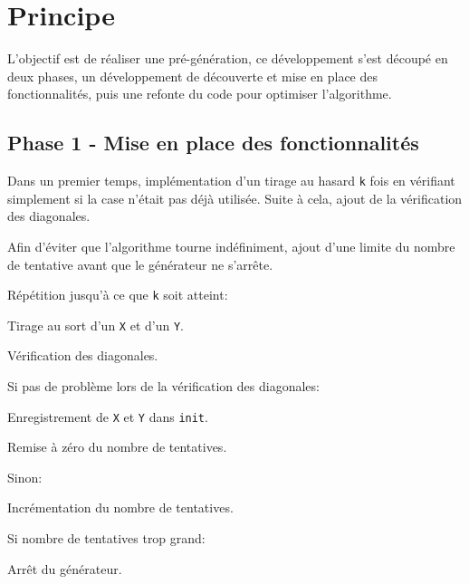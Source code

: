 \documentclass[a4paper, 10pt]{article}
\begin{document}
		\section{Principe}
            L'objectif est de réaliser une pré-génération, ce développement s'est découpé en deux phases, un développement de découverte et mise en place des fonctionnalités, puis une refonte du code pour optimiser l'algorithme.

            \subsection{Phase 1 - Mise en place des fonctionnalités}
                Dans un premier temps, implémentation d'un tirage au hasard \verb?k? fois en vérifiant simplement si la case n'était pas déjà utilisée. Suite à cela, ajout de la vérification des diagonales.

                Afin d'éviter que l'algorithme tourne indéfiniment, ajout d'une limite du nombre de tentative avant que le générateur ne s'arrête.

                \begin{description}
                    \item Répétition jusqu'à ce que \verb?k? soit atteint:
                    \begin{description}
                        \item Tirage au sort d'un \verb?X? et d'un \verb?Y?.
                        \item Vérification des diagonales.
                        \item Si pas de problème lors de la vérification des diagonales:
                        \begin{description}
                            \item Enregistrement de \verb?X? et \verb?Y? dans \verb?init?.
                            \item Remise à zéro du nombre de tentatives.
                        \end{description}
                        \item Sinon:
                        \begin{description}
                            \item Incrémentation du nombre de tentatives.
                            \item Si nombre de tentatives trop grand:
                            \begin{description}
                                \item Arrêt du générateur.
                            \end{description}
                        \end{description}
                    \end{description}
                \end{description}
\end{document}
